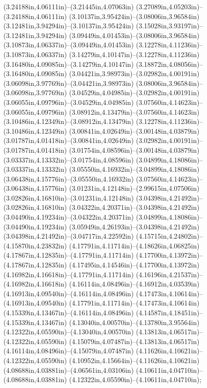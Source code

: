(3.24188in,4.06111in)--(3.21445in,4.07063in) (3.27089in,4.05203in)--(3.24188in,4.06111in) (3.10137in,3.95424in)--(3.08006in,3.96584in) (3.12481in,3.94294in)--(3.10137in,3.95424in) (3.15028in,3.93197in)--(3.12481in,3.94294in) (3.09449in,4.01453in)--(3.08006in,3.96584in) (3.10873in,4.06337in)--(3.09449in,4.01453in) (3.12278in,4.11236in)--(3.10873in,4.06337in) (3.14279in,4.10147in)--(3.12278in,4.11236in) (3.16480in,4.09085in)--(3.14279in,4.10147in) (3.18872in,4.08056in)--(3.16480in,4.09085in) (3.04421in,3.98973in)--(3.02982in,4.00191in) (3.06098in,3.97769in)--(3.04421in,3.98973in) (3.08006in,3.96584in)--(3.06098in,3.97769in) (3.04529in,4.04985in)--(3.02982in,4.00191in) (3.06055in,4.09796in)--(3.04529in,4.04985in) (3.07560in,4.14623in)--(3.06055in,4.09796in) (3.08912in,4.13479in)--(3.07560in,4.14623in) (3.10486in,4.12349in)--(3.08912in,4.13479in) (3.12278in,4.11236in)--(3.10486in,4.12349in) (3.00841in,4.02649in)--(3.00148in,4.03879in) (3.01787in,4.01418in)--(3.00841in,4.02649in) (3.02982in,4.00191in)--(3.01787in,4.01418in) (3.01754in,4.08596in)--(3.00148in,4.03879in) (3.03337in,4.13332in)--(3.01754in,4.08596in) (3.04899in,4.18086in)--(3.03337in,4.13332in) (3.05550in,4.16932in)--(3.04899in,4.18086in) (3.06438in,4.15776in)--(3.05550in,4.16932in) (3.07560in,4.14623in)--(3.06438in,4.15776in) (3.01231in,4.12148in)--(2.99615in,4.07506in) (3.02826in,4.16810in)--(3.01231in,4.12148in) (3.04398in,4.21492in)--(3.02826in,4.16810in) (3.04322in,4.20371in)--(3.04398in,4.21492in) (3.04490in,4.19234in)--(3.04322in,4.20371in) (3.04899in,4.18086in)--(3.04490in,4.19234in) (3.05949in,4.26193in)--(3.04398in,4.21492in) (3.04398in,4.21492in)--(3.04717in,4.22592in) (4.15715in,4.24802in)--(4.15870in,4.23832in) (4.17791in,4.11714in)--(4.18626in,4.06825in) (4.17867in,4.12835in)--(4.17791in,4.11714in) (4.17700in,4.13972in)--(4.17867in,4.12835in) (4.17495in,4.14546in)--(4.17700in,4.13972in) (4.16982in,4.16618in)--(4.17791in,4.11714in) (4.16196in,4.21537in)--(4.16982in,4.16618in) (4.16114in,4.08496in)--(4.16912in,4.03539in) (4.16913in,4.09540in)--(4.16114in,4.08496in) (4.17473in,4.10614in)--(4.16913in,4.09540in) (4.17791in,4.11714in)--(4.17473in,4.10614in) (4.15339in,4.13467in)--(4.16114in,4.08496in) (4.14587in,4.18451in)--(4.15339in,4.13467in) (4.13040in,4.00570in)--(4.13780in,3.95564in) (4.12322in,4.05590in)--(4.13040in,4.00570in) (4.13813in,4.06517in)--(4.12322in,4.05590in) (4.15079in,4.07487in)--(4.13813in,4.06517in) (4.16114in,4.08496in)--(4.15079in,4.07487in) (4.11626in,4.10621in)--(4.12322in,4.05590in) (4.10952in,4.15664in)--(4.11626in,4.10621in) (4.08688in,4.03881in)--(4.06561in,4.03106in) (4.10611in,4.04710in)--(4.08688in,4.03881in) (4.12322in,4.05590in)--(4.10611in,4.04710in);
